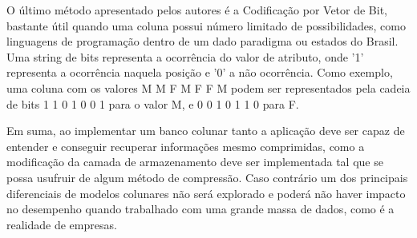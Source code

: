 
O último método apresentado pelos autores é a Codificação por Vetor de Bit, bastante útil quando uma coluna possui número limitado 
de possibilidades, como linguagens de programação dentro de um dado paradigma ou estados do Brasil. Uma string de bits representa a 
ocorrência do valor de atributo, onde '1' representa a ocorrência naquela posição e '0' a não ocorrência. Como exemplo, uma coluna com os 
valores {M M F M F F M} podem ser representados pela cadeia de bits 1 1 0 1 0 0 1 para o valor M, e 0 0 1 0 1 1 0 para F.

Em suma, ao implementar um banco colunar tanto a aplicação deve ser capaz de entender e conseguir recuperar informações mesmo comprimidas, como a modificação da camada de armazenamento deve ser implementada tal que se possa usufruir de algum método de compressão. Caso contrário um 
dos principais diferenciais de modelos colunares não será explorado e poderá não haver impacto no desempenho quando trabalhado com uma 
grande massa de dados, como é a realidade de empresas.
